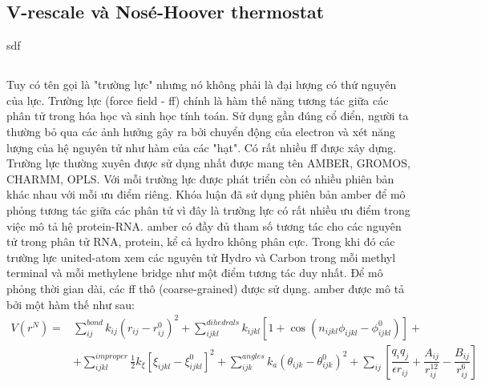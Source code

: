 \documentclass[12pt,a4paper,reqno, oneside]{book}
\begin{document}
	\subsection{V-rescale và Nosé-Hoover thermostat}
	\hspace{18pt}
		sdf
	\subsection{}
	\subsection{}
	\hspace{18pt}
		Tuy có tên gọi là "trường lực" nhưng nó không phải là đại lượng có thứ nguyên của lực. Trường lực (force field - ff) chính là hàm thế năng tương tác giữa các phân tử trong hóa học và sinh học tính toán. Sử dụng gần đúng cổ điển, người ta thường bỏ qua các ảnh hưởng gây ra bởi chuyển động của electron và xét năng lượng của hệ nguyên tử như hàm của các "hạt". Có rất nhiều ff được xây dựng. Trường lực thường xuyên được sử dụng nhất được mang tên AMBER\cite{Duan2003,Cornell1995,Hornak2006}, GROMOS\cite{}, CHARMM\cite{}, OPLS\cite{}. Với mỗi trường lực được phát triển còn có nhiều phiên bản khác nhau với mỗi ưu điểm riêng.
		Khóa luận đã sử dụng phiên bản \gls{amber} để mô phỏng tương tác giữa các phân tử vì đây là trường lực có rất nhiều ưu điểm trong việc mô tả hệ protein-RNA\cite{}. \Gls{amber} có đầy đủ tham số tương tác cho các nguyên tử trong phân tử RNA, protein, kể cả hydro không phân cực. Trong khi đó các trường lực united-atom xem các nguyên tử Hydro và Carbon trong mỗi methyl terminal và mỗi methylene bridge như một điểm tương tác duy nhất. Để mô phỏng thời gian dài, các ff thô (coarse-grained) được sử dụng.
		\Gls{amber} được mô tả bởi một hàm thế như sau:
		\begin{align}
		V(r^{N}) =& \sum_{ij}^{bond}k_{ij}\left(r_{ij} - r_{ij}^{0}\right)^{2} +\sum_{ijkl}^{dihedrals}k_{ijkl}\left[1+\cos\left(n_{ijkl}\phi_{ijkl}-\phi_{ijkl}^{0}\right)\right] +\nonumber\\
			&+ \sum_{ijkl}^{improper}\frac{1}{2} k_{\xi}\left[\xi_{ijkl}-\xi_{ijkl}^{0}\right]^{2} + \sum_{ijk}^{angles}k_{a}(\theta_{ijk}-\theta_{ijk}^{0})^{2}+ \sum_{ij}\left[\dfrac{q_{i} q_{j}}{\epsilon r_{ij}}+\dfrac{A_{ij}}{r_{ij}^{12}}-\dfrac{B_{ij}}{r_{ij}^{6}}\right]
		\label{ff}
		\end{align}
\end{document}
